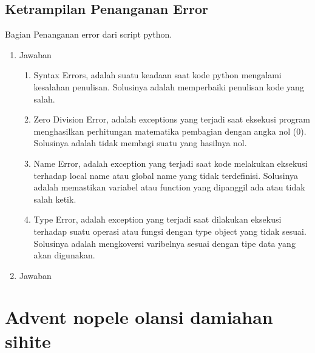 \subsection{Ketrampilan Penanganan Error}
Bagian Penanganan error dari script python.
\begin{enumerate}
\item Jawaban
\begin{enumerate}
\item Syntax Errors, adalah suatu keadaan saat kode python mengalami kesalahan penulisan. Solusinya adalah memperbaiki penulisan kode yang salah.

\item Zero Division Error, adalah exceptions yang terjadi saat eksekusi program menghasilkan perhitungan matematika pembagian dengan angka nol (0). Solusinya adalah tidak membagi suatu yang hasilnya nol.

\item Name Error, adalah exception yang terjadi saat kode melakukan eksekusi terhadap local name atau global name yang tidak terdefinisi. Solusinya adalah memastikan variabel atau function yang dipanggil ada atau tidak salah ketik.

\item Type Error, adalah exception yang terjadi saat dilakukan eksekusi terhadap suatu operasi atau fungsi dengan type object yang tidak sesuai. Solusinya adalah mengkoversi varibelnya sesuai dengan tipe data yang akan digunakan.

\end{enumerate}
\item Jawaban																	

\end{enumerate}

\section{Advent nopele olansi damiahan sihite}
